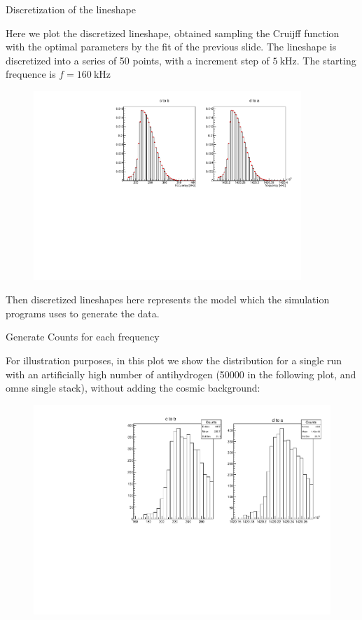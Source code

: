 \documentclass[9pt]{beamer}
\newcommand{\nologo}{\setbeamertemplate{logo}{}}
\begin{document}
{\nologo
\begin{frame}{Discretization of the lineshape}

Here we plot the discretized lineshape, obtained sampling the Cruijff function with the optimal parameters by the fit of the previous slide. The lineshape is discretized into a series of 50 points, with a increment step of $\SI{5}{\kilo \hertz}$. The starting frequence is $f = \SI{160}{\kilo \hertz}$ 

\begin{figure}[hbtp]
\centering
\includegraphics[width = 0.9\textwidth]{../Plot/CruijffLineShapes.pdf}
\end{figure}

Then discretized lineshapes here represents the model which the simulation programs uses to generate the data.
\end{frame}

\begin{frame}{Generate Counts for each frequency}

For illustration purposes, in this plot we show the distribution for a single run with an artificially high number of antihydrogen (50000 in the following plot, and omne single stack), without adding the cosmic background:

\begin{figure}[hbtp]
\centering
\includegraphics[width = \textwidth]{../Plot/LineshapeSampled.pdf}
\end{figure}
\end{frame}
}
\end{document}
